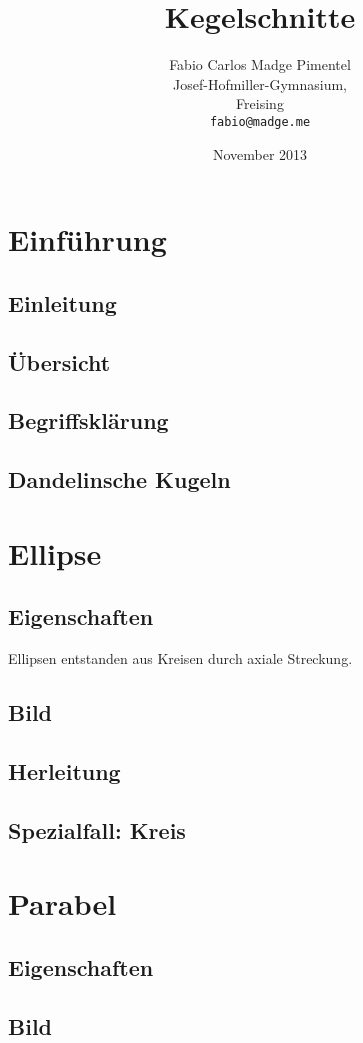 \documentclass[12pt, a4paper, draft]{report}
\title{Kegelschnitte}
\author{Fabio Carlos Madge Pimentel\\
  Josef-Hofmiller-Gymnasium,\\
  Freising\\
  \texttt{fabio@madge.me}}
\date{November 2013}
\begin{document}


\setcounter{page}{2}
\tableofcontents
\clearpage

\chapter{Einführung}
	\setcounter{section}{0}
	\section{Einleitung}
	\section{Übersicht}
	\section{Begriffsklärung}
	\section{Dandelinsche Kugeln}

\chapter{Ellipse}
	\setcounter{section}{0}
	\section{Eigenschaften}
		Ellipsen entstanden aus Kreisen durch axiale Streckung. ~\cite{Bourke:1988}
	\section{Bild}
	\section{Herleitung}
	\section{Spezialfall: Kreis}

\chapter{Parabel}
	\setcounter{section}{0}
	\section{Eigenschaften}
	\section{Bild}
\end{document}
